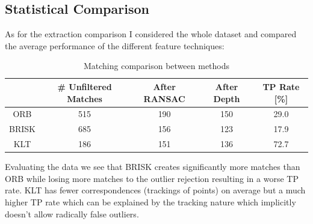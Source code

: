 {    \subsection{Statistical Comparison}{
        As for the extraction comparison I considered the whole dataset and compared the average performance of the different feature techniques:

        \begin{table}[!ht]
            \setlength{\extrarowheight}{10pt}
            \centering
            \begin{tabular}{ccccc}
                & \# Unfiltered Matches & After RANSAC & After Depth & TP Rate [\%]\\[12pt]
                \hline
                ORB & 515 & 190 & 150 & 29.0\\[12pt]
                \hline
                BRISK & 685 & 156 & 123 & 17.9\\[12pt]
                \hline
                KLT & 186 & 151 & 136 & 72.7\\[12pt]
                \hline
            \end{tabular}
            \caption{Matching comparison between methods}
            \label{tab:matching_descriptors}
        \end{table}

        Evaluating the data we see that BRISK creates significantly more matches than ORB while losing more matches to the outlier rejection resulting in a worse TP rate. KLT has fewer correspondences (trackings of points) on average but a much higher TP rate which can be explained by the tracking nature which implicitly doesn't allow radically false  outliers.

    }


    
}

